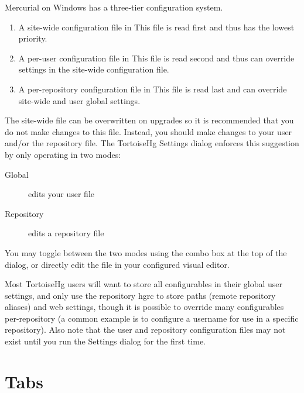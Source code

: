 \documentclass[letterpaper,10pt,english]{manual}
\begin{document}
Mercurial on Windows has a three-tier configuration system.
\begin{enumerate}
\item {} 
A site-wide configuration file in
This file is read first and thus has the lowest priority.

\item {} 
A per-user configuration file in
This file is read second and thus can override settings in the
site-wide configuration file.

\item {} 
A per-repository configuration file in  This
file is read last and can override site-wide and user global settings.

\end{enumerate}

The site-wide file can be overwritten on upgrades so it is recommended
that you do not make changes to this file.  Instead, you should make
changes to your user  and/or the repository
 file.  The TortoiseHg Settings dialog enforces this
suggestion by only operating in two modes:
\begin{description}
\item[Global]
edits your user  file

\item[Repository]
edits a repository  file

\end{description}

You may toggle between the two modes using the combo box at the top of
the dialog, or directly edit the file in your configured visual editor.

Most TortoiseHg users will want to store all configurables in their
global user settings, and only use the repository hgrc to store paths
(remote repository aliases) and web settings, though it is possible to
override many configurables per-repository (a common example is to
configure a username for use in a specific repository).  Also note that
the user and repository configuration files may not exist until you run
the Settings dialog for the first time.


\section{Tabs}
\end{document}

